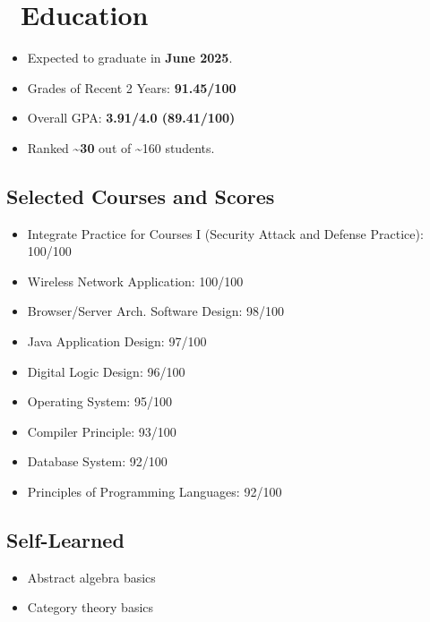 \documentclass{resume}
\begin{document}



\section{\faGraduationCap\ Education}
\begin{itemize}
  \item Expected to graduate in \textbf{June 2025}.
  \item Grades of Recent 2 Years: \textbf{91.45/100}
  \item Overall GPA: \textbf{3.91/4.0 (89.41/100)}
  \item Ranked \textbf{\textasciitilde 30} out of \textasciitilde 160 students.
\end{itemize}
\subsection{Selected Courses and Scores}
\begin{itemize}
  \item Integrate Practice for Courses I (Security Attack and Defense Practice): 100/100
  \item Wireless Network Application: 100/100
  \item Browser/Server Arch. Software Design: 98/100
  \item Java Application Design: 97/100
  \item Digital Logic Design: 96/100
  \item Operating System: 95/100
  \item Compiler Principle: 93/100
  \item Database System: 92/100
  \item Principles of Programming Languages: 92/100
\end{itemize}
\subsection{Self-Learned}
\begin{itemize}[parsep=0.5ex]
  \item Abstract algebra basics
  \item Category theory basics
\end{itemize}
\end{document}

